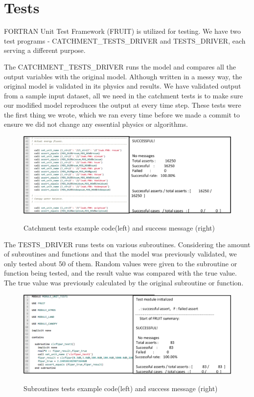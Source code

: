 \documentclass[pdftex,12pt,a4paper]{article}
\begin{document}
\section{Tests}

FORTRAN Unit Test Framework (FRUIT) is utilized for testing. We have two test programs - CATCHMENT\_TESTS\_DRIVER and TESTS\_DRIVER, each serving a different purpose.

The CATCHMENT\_TESTS\_DRIVER runs the model and compares all the output variables with the original model. Although written in a messy way, the original model is validated in its physics and results. We have validated output from a sample input dataset, all we need in the catchment tests is to make sure our modified model reproduces the output at every time step. These tests were the first thing we wrote, which we ran every time before we made a commit to ensure we did not change any essential physics or algorithms.

\begin{figure}[h]
	\centering
	\includegraphics[width=5.5in]{Figures/Tests1.png}
	\label{Tests1}
	\caption{Catchment tests example code(left) and success message (right)}
\end{figure}

The TESTS\_DRIVER runs tests on various subroutines. Considering the amount of subroutines and functions and that the model was previously validated, we only tested about 50 of them. Random values were given to the subroutine or function being tested, and the result value was compared with the true value. The true value was previously calculated by the original subroutine or function. 

\begin{figure}[h]
	\centering
	\includegraphics[width=5.5in]{Figures/Tests2.png}
	\label{Tests1}
	\caption{Subroutines tests example code(left) and success message (right)}
\end{figure}
\end{document}
